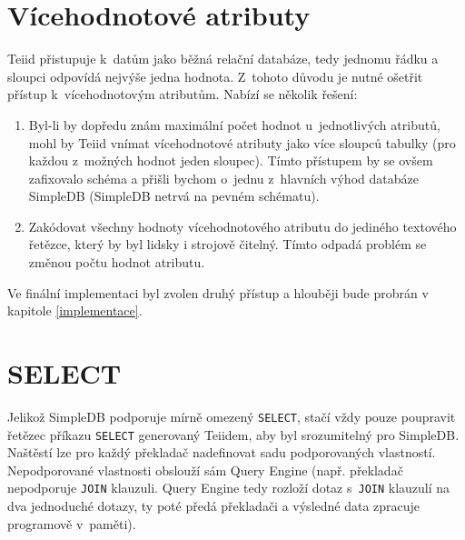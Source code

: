 \documentclass[oneside,12pt,final]{fithesis2}
\begin{document}
\section{Vícehodnotové atributy}
Teiid přistupuje k~datům jako běžná relační databáze, tedy jednomu řádku a sloupci odpovídá nejvýše jedna hodnota. Z~tohoto důvodu je nutné ošetřit přístup k~vícehodnotovým atributům. Nabízí se několik řešení:
\begin{enumerate}
 \item Byl-li by dopředu znám maximální počet hodnot u~jednotlivých atributů, mohl by Teiid vnímat vícehodnotové atributy jako více sloupců tabulky (pro každou z~možných hodnot jeden sloupec). Tímto přístupem by se ovšem zafixovalo schéma a přišli bychom o~jednu z~hlavních výhod databáze SimpleDB (SimpleDB netrvá na pevném schématu).
 \item Zakódovat všechny hodnoty vícehodnotového atributu do jediného textového řetězce, který by byl lidsky i strojově čitelný. Tímto odpadá problém se změnou počtu hodnot atributu.
\end{enumerate}
Ve finální implementaci byl zvolen druhý přístup a hlouběji bude probrán v kapitole \ref{implementace}.

\section{SELECT}
Jelikož SimpleDB podporuje mírně omezený \verb|SELECT|, stačí vždy pouze poupravit řetězec příkazu \verb|SELECT| generovaný Teiidem, aby byl srozumitelný pro SimpleDB. Naštěstí lze pro každý překladač nadefinovat sadu podporovaných vlastností. Nepodporované vlastnosti obslouží sám Query Engine (např. překladač nepodporuje \verb<JOIN< klauzuli. Query Engine tedy rozloží dotaz s~\verb<JOIN< klauzulí na dva jednoduché dotazy, ty poté předá překladači a výsledné data zpracuje programově v~paměti).
\end{document}
